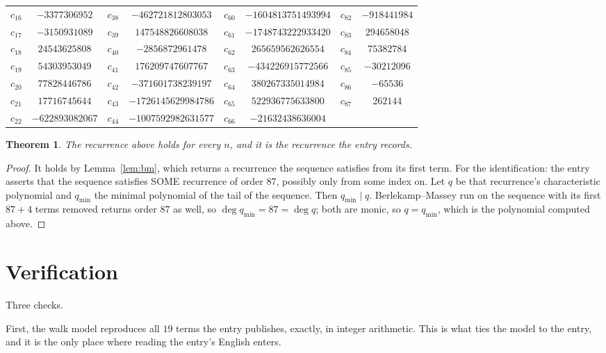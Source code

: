 \documentclass[11pt,a4paper]{article}
\theoremstyle{plain}
\newtheorem{theorem}{Theorem}
\theoremstyle{definition}
\begin{document}
\begin{center}
\begin{tabular}{cccccccc}
$c_{16}$ & $-3377306952$ & $c_{38}$ & $-462721812803053$ & $c_{60}$ & $-1604813751493994$ & $c_{82}$ & $-918441984$ \\
$c_{17}$ & $-3150931089$ & $c_{39}$ & $147548826608038$ & $c_{61}$ & $-1748743222933420$ & $c_{83}$ & $294658048$ \\
$c_{18}$ & $24543625808$ & $c_{40}$ & $-2856872961478$ & $c_{62}$ & $265659562626554$ & $c_{84}$ & $75382784$ \\
$c_{19}$ & $54303953049$ & $c_{41}$ & $176209747607767$ & $c_{63}$ & $-434226915772566$ & $c_{85}$ & $-30212096$ \\
$c_{20}$ & $77828446786$ & $c_{42}$ & $-371601738239197$ & $c_{64}$ & $380267335014984$ & $c_{86}$ & $-65536$ \\
$c_{21}$ & $17716745644$ & $c_{43}$ & $-1726145629984786$ & $c_{65}$ & $522936775633800$ & $c_{87}$ & $262144$ \\
$c_{22}$ & $-622893082067$ & $c_{44}$ & $-1007592982631577$ & $c_{66}$ & $-21632438636004$ &  &  \\
\end{tabular}
\end{center}

\begin{theorem}
The recurrence above holds for every $n$, and it is the recurrence the entry records.
\end{theorem}

\begin{proof}
It holds by Lemma~\ref{lem:bm}, which returns a recurrence the sequence satisfies from its
first term. For the identification: the entry asserts that the sequence satisfies SOME
recurrence of order $87$, possibly only from some index on. Let $q$ be that recurrence's
characteristic polynomial and $q_{\min}$ the minimal polynomial of the tail of the sequence.
Then $q_{\min}\mid q$. Berlekamp--Massey run on the sequence with its first $87+4$ terms
removed returns order $87$ as well, so $\deg q_{\min}=87=\deg q$; both are monic, so
$q=q_{\min}$, which is the polynomial computed above.
\end{proof}

\section{Verification}

Three checks.

First, the walk model reproduces all $19$ terms the entry publishes, exactly, in integer
arithmetic. This is what ties the model to the entry, and it is the only place where reading
the entry's English enters.
\end{document}
